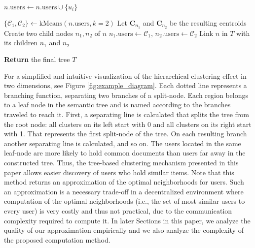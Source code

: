 \documentclass[10pt,journal]{IEEEtran}
\begin{document}
\begin{algorithm}[]
\begin{algorithmic}[1]
    \STATE {}
    \STATE $n.\text{users} \gets n.\text{users} \cup \{u_i\}$

        \STATE {}
        \STATE $\{\mathcal{C}_1, \mathcal{C}_2\} \gets \text{kMeans}(n.\text{users}, k=2)$
        \STATE Let $\mathbf{C}_{n_1}$ and $\mathbf{C}_{n_2}$ be the resulting centroids
        \STATE Create two child nodes $n_1, n_2$ of $n$
        \STATE $n_1.\text{users} \gets \mathcal{C}_1$, \quad $n_2.\text{users} \gets \mathcal{C}_2$
        \STATE Link $n$ in $T$ with its children $n_1$ and $n_2$ 
        \STATE {}
    \ENDIF

\ENDFOR

\STATE \textbf{Return} the final tree $T$
\end{algorithmic}
\end{algorithm}

For a simplified and intuitive visualization of the hierarchical clustering effect in two dimensions, see Figure \ref{fig:example_diagram}. Each dotted line represents a branching function, separating two branches of a split-node. Each region belongs to a leaf node in the semantic tree and is named according to the branches traveled to reach it. First, a separating line is calculated that splits the tree from the root node: all clusters on its left start with 0 and all clusters on its right start with 1. That represents the first split-node of the tree. On each resulting branch another separating line is calculated, and so on. The users located in the same leaf-node are more likely to hold common documents than users far away in the constructed tree. Thus, the tree-based clustering mechanism presented in this paper allows easier discovery of users who hold similar items. Note that this method returns an approximation of the optimal neighborhoods for users. Such an approximation is a necessary trade-off in a decentralized environment where computation of the optimal neighborhoods (i.e., the set of most similar users to every user) is very costly and thus not practical, due to the communication complexity required to compute it. In later Sections in this paper, we analyze the quality of our approximation empirically and we also analyze the complexity of the proposed computation method.
\end{document}
